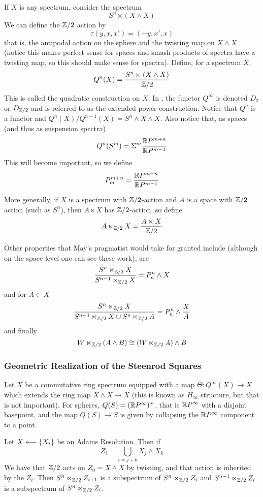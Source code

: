 If $X$ is any spectrum, consider the spectrum
\[S^n\ltimes (X\wedge X)\]
We can define the $\mathbb{Z}/2$ action by 
\[\tau(y,x,x')=(-y,x',x)\]
that is, the antipodal action on the sphere and the twisting map on $X\wedge X$ (notice this makes perfect sense for spaces and smash products of spectra have a twisting map, so this should make sense for spectra).  Define, for a spectrum $X$,
\[Q^n(X) = \frac{S^n\ltimes (X\wedge X)}{\mathbb{Z}/2}\]
This is called the quadratic construction on $X$.  
In \cite{H00RingSpectra}, the functor $Q^\infty$ is denoted $D_2$ or $D_{\mathbb{Z}/2}$ and is referred to as the extended power construction.  Notice that $Q^n$ is a functor and $Q^n(X)/Q^{n-1}(X)=S^n\wedge X\wedge X$. 
Also notice that, as spaces (and thus as suspension spectra)
\[Q^n(S^m) = \Sigma^m\frac{\mathbb{R} P^{m+n}}{\mathbb{R} P^{m-1}}\]
This will become important, so we define
\[P_m^{m+n} = \frac{\mathbb{R} P^{m+n}}{\mathbb{R} P^{m-1}}\]


More generally, if $X$ is a spectrum with $\mathbb{Z}/2$-action and $A$ is a space with $\mathbb{Z}/2$ action (such as $S^n$), then $A\ltimes X$ has $\mathbb{Z}/2$-action, so define
\[A\ltimes_{\mathbb{Z}/2}X = \frac{A\ltimes X}{\mathbb{Z}/2}\]


Other properties that May's pragmatist would take for granted include (although on the space level one can see these work), are
\[\frac{S^n\ltimes_{\mathbb{Z}/2} X}{S^{n-1}\ltimes_{\mathbb{Z}/2} X} = P^{n}_n\wedge X\]
and for $A\subset X$
\[\frac{S^n\ltimes_{\mathbb{Z}/2} X}{S^{n-1}\ltimes_{\mathbb{Z}/2} X\cup S^{n}\ltimes_{\mathbb{Z}/2} A}= P_n^n\wedge \frac{X}{A}\]
and finally
\[W\ltimes_{\mathbb{Z}/2}(A\wedge B)\cong (W\ltimes_{\mathbb{Z}/2}A)\wedge B\]


\subsubsection{Geometric Realization of the Steenrod Squares}

Let $X$ be a commutative ring spectrum equipped with a map $\Theta:Q^\infty(X)\to X$ which extends the ring map $X\wedge X\to X$ (this is known as $H_\infty$ structure, but that is not important).  For spheres, $Q(S)=(\mathbb{R} P^\infty)^+$, that is $\mathbb{R} P^\infty$ with a disjoint basepoint, and the map $Q(S)\to S$ is given by collapsing the $\mathbb{R} P^\infty$ component to a point.  


Let $X\longleftarrow \{X_i\}$ be an Adams Resolution.  
Then if 
\[Z_i = \bigcup_{i=j+k} X_j\wedge X_k\]
We have that $\mathbb{Z}/2$ acts on $Z_0=X\wedge X$ by twisting, and that action is inherited by the $Z_i$.  
Then $S^n\ltimes_{\mathbb{Z}/2} Z_{i+1}$ is a subspectrum of $S^n\ltimes_{\mathbb{Z}/2} Z_{i}$ and $S^{n-1}\ltimes_{\mathbb{Z}/2} Z_i$ is a subspectrum of $S^n\ltimes_{\mathbb{Z}/2} Z_i$.  

